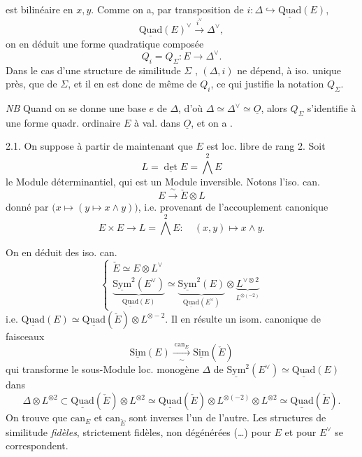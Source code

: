 \documentclass[11pt,a4paper]{article}
\begin{document}
est bilinéaire en $x, y$. Comme on a, par transposition de $i : \Delta \hookrightarrow \underline{\mathrm{Quad}}(E)$,
\[
  \underline{\mathrm{Quad}}(E)^\vee \xrightarrow{\ i^\vee\ } \Delta^\vee ,
\]
on en déduit une forme quadratique composée
\[
  Q_i = Q_\Sigma : E \longrightarrow \Delta^\vee .
\]
Dans le cas d'une structure de similitude $\Sigma$ , $(\Delta, i)$ ne dépend, à iso.  unique près, que de $\Sigma$, et il en est donc de même de $Q_i$, ce qui justifie la notation $Q_\Sigma$. 

\emph{NB} Quand on se donne une base $e$ de $\Delta$, d'où $\Delta \simeq \Delta^\vee \simeq \underline{O}$, alors $Q_\Sigma$ s'identifie à une forme quadr. ordinaire $E$ à val. dans $\underline{O}$, et on a \ill{} \struck{\ill{}} .


2.1. On suppose à partir de maintenant que $E$ est loc. libre de rang 2. Soit
\[
  L = \underline{\det} E = \textstyle\bigwedge^2 E
\]
le Module déterminantiel, qui est un Module inversible. Notons l'iso. can.
\[
  E \xrightarrow{\ \sim\ } \check E \otimes L
\]
donné par $\bigl(x \longmapsto (y \longmapsto x \wedge y)\bigr)$, i.e. provenant de l'accouplement canonique
\[
  E \times E \longrightarrow L = \textstyle\bigwedge^2 E : \quad (x, y) \longmapsto x \wedge y .
\]

On en déduit des iso. can.
\[
  \begin{cases}
    \check E \simeq E \otimes L^\vee \\
    \underbrace{\underline{\mathrm{Sym}}^2(E^\vee)}_{\underline{\mathrm{Quad}}(E)} \simeq \underbrace{\underline{\mathrm{Sym}}^2(E)}_{\underline{\mathrm{Quad}}(E^\vee)} \otimes \underbrace{L^{\vee \otimes 2}}_{L^{\otimes(-2)}}
  \end{cases}
\]
i.e. $\underline{\mathrm{Quad}}(E) \simeq \underline{\mathrm{Quad}}(\check E) \otimes L^{\otimes -2}$.
Il en résulte un isom. canonique de faisceaux
\[
  \underline{\mathrm{Sim}}(E) \xrightarrow[\ \sim\ ]{\ \mathrm{can}_E\ } \underline{\mathrm{Sim}}(\check E)
\]
qui transforme le sous-Module loc. monogène $\Delta$ de $\underline{\mathrm{Sym}}^2(E^\vee) \simeq \underline{\mathrm{Quad}}(E)$ dans
\[
  \Delta \otimes L^{\otimes 2} \subset \underline{\mathrm{Quad}}(\check E) \otimes L^{\otimes 2}
  \simeq \underline{\mathrm{Quad}}(\check E) \otimes L^{\otimes(-2)} \otimes L^{\otimes 2}
  \simeq \underline{\mathrm{Quad}}(\check E).
\]
On trouve que $\mathrm{can}_E$ et $\mathrm{can}_{\check E}$ sont inverses l'un de l'autre. Les structures de similitude \emph{fidèles}, strictement fidèles, non dégénérées (…) pour $E$ et pour $E^\vee$ se correspondent.
\end{document}
